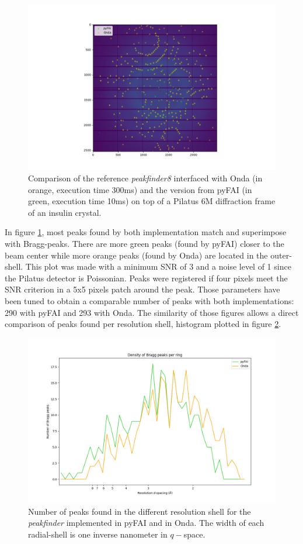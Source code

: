 \documentclass[preprint]{iucr}              %
\begin{document}
\begin{figure}
\label{peakfinder}
\includegraphics[width=12cm]{peakfinder}
\caption{Comparison of the reference \textit{peakfinder8} interfaced with Onda (in orange, execution time 300ms) and the version from pyFAI (in green, execution time 10ms) on top of a Pilatus 6M diffraction frame of an insulin crystal.}
\end{figure}

In figure \ref{peakfinder}, most peaks found by both implementation match and superimpose with Bragg-peaks.
There are more green peaks (found by pyFAI) closer to the beam center while more orange peaks (found by Onda) are located in the outer-shell.
This plot was made with a minimum SNR of 3 and a noise level of 1 since the Pilatus detector is Poissonian.
Peaks were registered if four pixels meet the SNR criterion in a 5x5 pixels patch around the peak.
Those parameters have been tuned to obtain a comparable number of peaks with both implementations: 290 with pyFAI and 293 with Onda.
The similarity of those figures allows a direct comparison of peaks found per resolution shell, histogram plotted in figure \ref{peak_per_ring}.

\begin{figure}
\label{peak_per_ring}
\includegraphics[width=12cm]{peak_per_ring}
\caption{Number of peaks found in the different resolution shell for the \textit{peakfinder} implemented in pyFAI and in Onda. The width of each radial-shell is one inverse nanometer in $q-$space.}
\end{figure}
\end{document}
